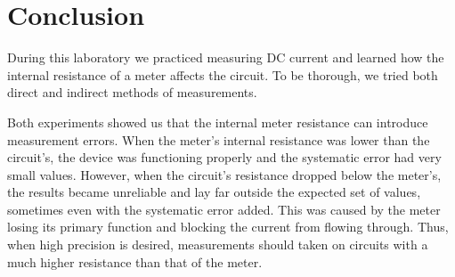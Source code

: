 \section{Conclusion}

During this laboratory we practiced measuring DC current and learned how the internal resistance of a meter affects the circuit. To be thorough, we tried both direct and indirect methods of measurements.

Both experiments showed us that the internal meter resistance can introduce measurement errors. When the meter’s internal resistance was lower than the circuit’s, the device was functioning properly and the systematic error had very small values. However, when the circuit's resistance dropped below the meter's, the results became unreliable and lay far outside the expected set of values, sometimes even with the systematic error added. This was caused by the meter losing its primary function and blocking the current from flowing through. Thus, when high precision is desired, measurements should taken on circuits with a much higher resistance than that of the meter.